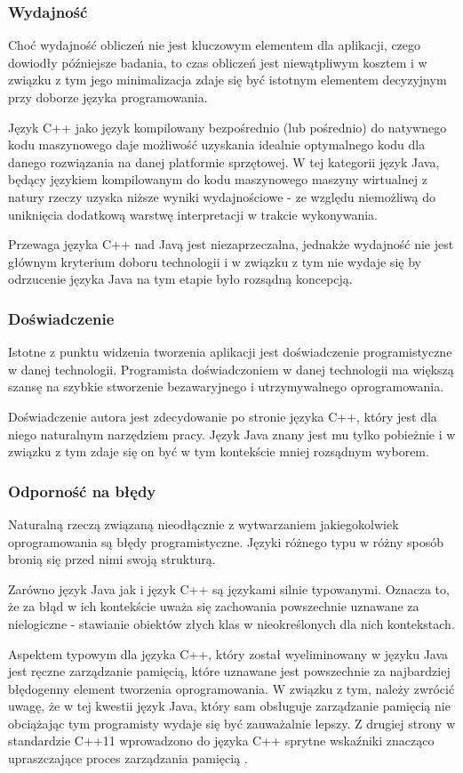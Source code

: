 {\subsubsection{Wydajność}
\par{
Choć wydajność obliczeń nie jest kluczowym elementem dla aplikacji, czego dowiodły późniejsze badania, to czas obliczeń jest niewątpliwym kosztem i w związku z tym jego minimalizacja zdaje się być istotnym elementem decyzyjnym przy doborze języka programowania.
}
\par{
Język C++ jako język kompilowany bezpośrednio (lub pośrednio) do natywnego kodu maszynowego daje możliwość uzyskania idealnie optymalnego kodu dla danego rozwiązania na danej platformie sprzętowej. W tej kategorii język Java, będący językiem kompilowanym do kodu maszynowego maszyny wirtualnej z natury rzeczy uzyska niższe wyniki wydajnościowe - ze względu niemożliwą do uniknięcia dodatkową warstwę interpretacji w trakcie wykonywania.
}
\par{
Przewaga języka C++ nad Javą jest niezaprzeczalna, jednakże wydajność nie jest głównym kryterium doboru technologii i w związku z tym nie wydaje się by odrzucenie języka Java na tym etapie było rozsądną koncepcją.
}
\subsubsection{Doświadczenie}
\par{
Istotne z punktu widzenia tworzenia aplikacji jest doświadczenie programistyczne w danej technologii. Programista doświadczoniem w danej technologii ma większą szansę na szybkie stworzenie bezawaryjnego i utrzymywalnego oprogramowania.
}
\par{
Doświadczenie autora jest zdecydowanie po stronie języka C++, który jest dla niego naturalnym narzędziem pracy. Język Java znany jest mu tylko pobieżnie i w związku z tym zdaje się on być w tym kontekście mniej rozsądnym wyborem.
}
\subsubsection{Odporność na błędy}
\par{
Naturalną rzeczą związaną nieodłącznie z wytwarzaniem jakiegokolwiek oprogramowania są błędy programistyczne. Języki różnego typu w różny sposób bronią się przed nimi swoją strukturą.
}
\par{
Zarówno język Java jak i język C++ są językami silnie typowanymi. Oznacza to, że za błąd w ich kontekście uważa się zachowania powszechnie uznawane za nielogiczne - stawianie obiektów złych klas w nieokreślonych dla nich kontekstach.
}
\par{
Aspektem typowym dla języka C++, który został wyeliminowany w języku Java jest ręczne zarządzanie pamięcią, które uznawane jest powszechnie za najbardziej błędogenny element tworzenia oprogramowania. W związku z tym, należy zwrócić uwagę, że w tej kwestii język Java, który sam obsługuje zarządzanie pamięcią \cite{Java} nie obciążając tym programisty wydaje się być zauważalnie lepszy. Z drugiej strony w standardzie C++11 wprowadzono do języka C++ sprytne wskaźniki znacząco upraszczające proces zarządzania pamięcią \cite{isoCPP}.
}
}
